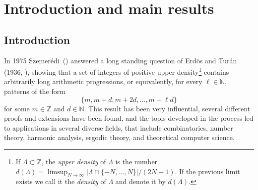 \documentclass[11pt]{amsart}
\newcommand{\N}{\mathbb{N}}
\newcommand{\Z}{\mathbb{Z}}
\theoremstyle{plain}
\theoremstyle{definition}
\theoremstyle{remark}
\begin{document}




\maketitle

\setcounter{tocdepth}{1}%
\tableofcontents
\section{Introduction and main results}
\subsection{Introduction}
In 1975 Szemer\'edi~(\cite{Sz}) answered a long standing question of
Erd\"{o}s and Tur\'an (1936, \cite{ET}), showing that a set of
integers of positive upper density\footnote{If $\Lambda\subset \Z$,
  the {\it upper density} of $\Lambda$ is the number
  $\bar{d}(\Lambda)=\limsup_{N\to\infty}|\Lambda\cap \{-N,\ldots,N\}|/(2N+1)$.
  If the previous limit exists we call it the {\it
    density} of $\Lambda$ and denote it by $d(\Lambda)$.} contains
arbitrarily long arithmetic progressions, or equivalently, for every
$\ell\in\N$, patterns of the form
\begin{equation}\label{E:d}
  \{m, m+d,m+2d,\ldots, m+\ell d\}
\end{equation}
for some $m\in \Z$ and $d\in \N$. This result has been very influential,
several different proofs and extensions have been found, and the tools
developed in the process led to applications in
several diverse  fields, that include
combinatorics, number theory, harmonic analysis, ergodic theory, and
theoretical computer science.
\end{document}
